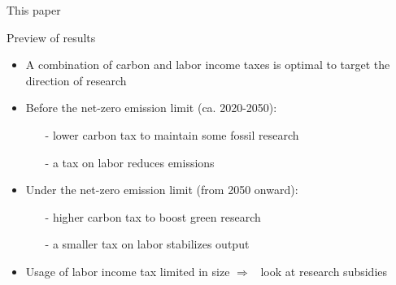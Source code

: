 \documentclass[11pt,aspectratio=169]{beamer}
\newcommand{\tr}[1]{\textcolor{blue}{#1}}
\newcommand{\ar}{$\Rightarrow$ \ }
\begin{document}
\begin{frame}{This paper}
{\begin{tikzpicture}
		\end{tikzpicture}
	}
	\end{frame}
	
	
	\begin{frame}{Preview of results}
		\centering
		\vspace{-3mm}
		\begin{itemize}[<+-| alert@+>]
			\item A combination of carbon and labor income taxes is optimal to target the direction of research
			\vspace{3mm}
			\item Before the net-zero emission limit (ca. 2020-2050): 
			\begin{itemize}
				\item[-] lower carbon tax to maintain some fossil research %
				\item[-] a tax on labor reduces emissions
			\end{itemize}
			\vspace{3mm}
			\item Under the net-zero emission limit (from 2050 onward): 
			\begin{itemize}
				\item[-]  higher carbon tax to boost green research
				\item[-]  a smaller tax on labor stabilizes output
			\end{itemize}
			\vspace{3mm}
			\item Usage of labor income tax limited in size \ar look at research subsidies
	\end{itemize}
\end{frame}
\end{document}
